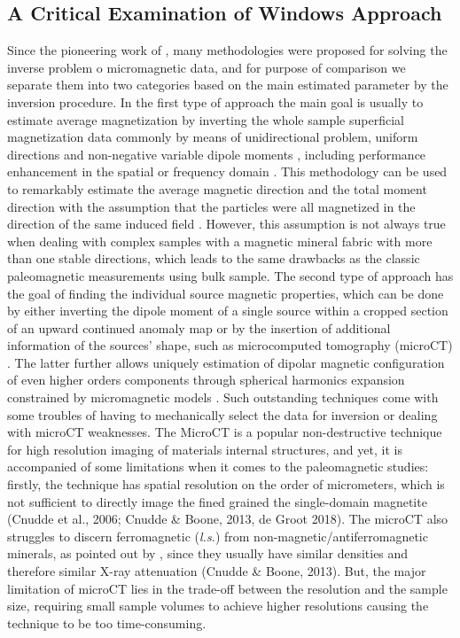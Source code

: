 \subsection{A Critical Examination of Windows Approach}%

Since the pioneering work of \cite{Egli2000}, many methodologies were proposed for solving the inverse problem o micromagnetic data, and for purpose of comparison we separate them into two categories based on the main estimated parameter by the inversion procedure. In the first type of approach the main goal is usually to estimate average magnetization by inverting the whole sample superficial magnetization data commonly by means of unidirectional problem, uniform directions and non-negative variable dipole moments \citep[e.g.,][]{Weiss2007}, including performance enhancement in the spatial  \citep[e.g.,][]{Myre2019} or frequency domain  \citep[e.g.,][]{Lima2013}. This methodology can be used to remarkably estimate the average magnetic direction and the total moment direction with the assumption that the particles were all magnetized in the direction of the same induced field \citep[sIRM and/or NRM in basalts,][]{Weiss2007}. However, this assumption is not always true when dealing with complex samples with a magnetic mineral fabric with more than one stable directions, which leads to the same drawbacks as the classic paleomagnetic measurements using bulk sample. The second type of approach has the goal of finding the individual source magnetic properties, which can be done by either inverting the dipole moment of a single source within a cropped section of an upward continued anomaly map \citep[e.g.,][]{Lima2016, Fu2020} or by the insertion of additional information of the sources’ shape, such as microcomputed tomography (microCT) \citep[e.g.,][]{Fabian2019, DeGroot2018, DeGroot2021} . The latter further allows uniquely estimation of dipolar magnetic configuration of even higher orders components through spherical harmonics expansion constrained by micromagnetic models \citep[e.g.,][]{CortesOrtuno2021, CortesOrtuno2022}. Such outstanding techniques come with some troubles of having to mechanically select the data for inversion or dealing with microCT weaknesses. The MicroCT is a popular non-destructive technique for high resolution imaging of materials internal structures, and yet, it is accompanied of some limitations when it comes to the paleomagnetic studies: firstly, the technique has spatial resolution on the order of micrometers, which is not sufficient to directly image the fined grained the single-domain magnetite (Cnudde et al., 2006; Cnudde & Boone, 2013, de Groot 2018). The microCT also struggles to discern ferromagnetic (\textit{l.s.}) from non-magnetic/antiferromagnetic minerals, as pointed out by \cite{DeGroot2021}, since they usually have similar densities and therefore similar X-ray attenuation (Cnudde & Boone, 2013). But, the major limitation of microCT lies in the trade-off between the resolution and the sample size, requiring small sample volumes to achieve higher resolutions causing the technique to be too time-consuming.

